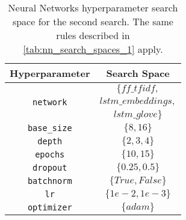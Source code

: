 \begin{table}[H]
    \centering
    \begin{tabular}{|c|c|}
        \hline

        \textbf{Hyperparameter} &
        \textbf{Search Space} \\

        \hline

        \multirow{3}{*}{\texttt{network}} &
        $\{ff\_tfidf,$ \\ 
        & $lstm\_embeddings,$ \\
        & $lstm\_glove\}$ \\

        \hline

        \texttt{base\_size} &
        $\{8, 16\}$ \\

        \hline

        \texttt{depth} &
        $\{2, 3, 4\}$ \\

        \hline

        \texttt{epochs} &
        $\{10, 15\}$ \\

        \hline

        \texttt{dropout} &
        $\{0.25, 0.5\}$ \\

        \hline

        \texttt{batchnorm} &
        $\{True, False\}$ \\

        \hline

        \texttt{lr} &
        $\{1e-2, 1e-3\}$ \\

        \hline

        \texttt{optimizer} &
        $\{adam\}$ \\

        \hline
    \end{tabular}
    \caption{Neural Networks hyperparameter 
    search space for the second search. 
    The same rules described in 
    \autoref{tab:nn_search_spaces_1} apply.}
    \label{tab:nn_search_spaces_2}
\end{table}